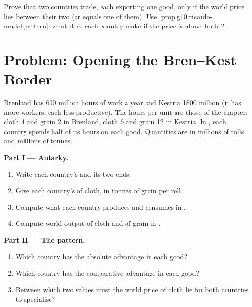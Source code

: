 \begin{exercise}[$\star\star\star$]\label{exo:g10:ricardo-model:15}
Prove that two countries trade, each exporting one good, only if the world price lies between their two  (or equals one of them). Use \cref{prop:g10:ricardo-model:pattern}: what does each country make if the
price is above both ?
\end{exercise}

\section{Problem: Opening the Bren--Kest Border}

\begin{problem}
\label{pb:g10:ricardo-model:1}
Brenland has 600 million hours of work a year and Kestria \num{1800} million (it has more workers, each less
productive). The hours per unit are those of the chapter: cloth 4 and grain 2 in Brenland, cloth 6 and grain 12 in
Kestria. In , each country spends half of its hours on each good. Quantities are in millions of rolls and
millions of tonnes.

\medskip
\noindent\textbf{Part I --- Autarky.}
\begin{enumerate}
\item Write each country's  and its two ends.
\item Give each country's  of cloth, in tonnes of grain per roll.
\item Compute what each country produces and consumes in .
\item Compute world output of cloth and of grain in .
\end{enumerate}

\medskip
\noindent\textbf{Part II --- The pattern.}
\begin{enumerate}[resume]
\item Which country has the absolute advantage in each good?
\item Which country has the comparative advantage in each good?
\item Between which two values must the world price of cloth lie for both countries to specialise?
\end{enumerate}


\end{problem}
